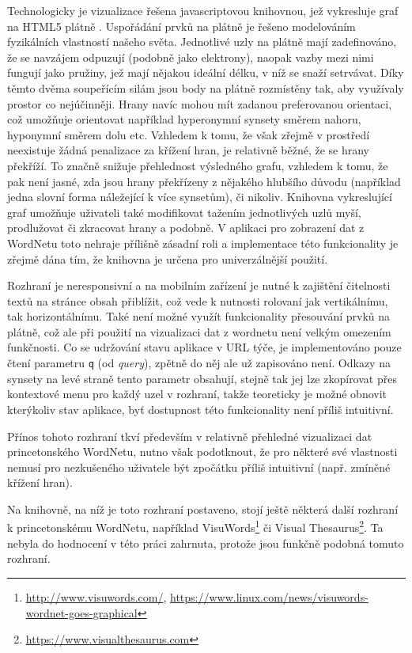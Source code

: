 \documentclass[a4paper, 11pt, oneside]{book}
\begin{document}
				Technologicky je vizualizace řešena javascriptovou knihovnou, jež vykresluje graf na HTML5 plátně \parencite{w3schools2017htmlcanvas}. Uspořádání prvků na plátně je řešeno modelováním fyzikálních vlastností našeho světa. Jednotlivé uzly na plátně mají zadefinováno, že se navzájem odpuzují (podobně jako elektrony), naopak vazby mezi nimi fungují jako pružiny, jež mají nějakou ideální délku, v níž se snaží setrvávat. Díky těmto dvěma soupeřícím silám jsou body na plátně rozmístěny tak, aby využívaly prostor co nejúčinněji. Hrany navíc mohou mít zadanou preferovanou orientaci, což umožňuje orientovat například hyperonymní synsety směrem nahoru, hyponymní směrem dolu etc. \parencite{wordvis2010vercruysse} Vzhledem k tomu, že však zřejmě v prostředí neexistuje žádná penalizace za křížení hran, je relativně běžné, že se hrany překříží. To značně snižuje přehlednost výsledného grafu, vzhledem k tomu, že pak není jasné, zda jsou hrany překřízeny z nějakého hlubšího důvodu (například jedna slovní forma náležející k více synsetům), či nikoliv. Knihovna vykreslující graf umožňuje uživateli také modifikovat tažením jednotlivých uzlů myší, prodlužovat či zkracovat hrany a podobně. V aplikaci pro zobrazení dat z WordNetu toto nehraje přílišně zásadní roli a implementace této funkcionality je zřejmě dána tím, že knihovna je určena pro univerzálnější použití. \parencite{wordvis2010vercruysse}

				Rozhraní je neresponsivní a na mobilním zařízení je nutné k zajištění čitelnosti textů na stránce obsah přiblížit, což vede k nutnosti rolovaní jak vertikálnímu, tak horizontálnímu. Také není možné využít funkcionality přesouvání prvků na plátně, což ale při použití na vizualizaci dat z wordnetu není velkým omezením funkčnosti. Co se udržování stavu aplikace v URL týče, je implementováno pouze čtení parametru {\tt q} (od \textit{query}), zpětně do něj ale už zapisováno není. Odkazy na synsety na levé straně tento parametr obsahují, stejně tak jej lze zkopírovat přes kontextové menu pro každý uzel v rozhraní, takže teoreticky je možné obnovit kterýkoliv stav aplikace, byť dostupnost této funkcionality není příliš intuitivní.

				Přínos tohoto rozhraní tkví především v relativně přehledné vizualizaci dat princetonského WordNetu, nutno však podotknout, že pro některé své vlastnosti nemusí pro nezkušeného uživatele být zpočátku příliš intuitivní (např. zmíněné křížení hran).

				Na knihovně, na níž je toto rozhraní postaveno, stojí ještě některá další rozhraní k princetonskému WordNetu, například VisuWords\footnote{\url{http://www.visuwords.com/}, \url{https://www.linux.com/news/visuwords-wordnet-goes-graphical}} či Visual Thesaurus\footnote{\url{https://www.visualthesaurus.com}}. Ta nebyla do hodnocení v této práci zahrnuta, protože jsou funkčně podobná tomuto rozhraní.
\end{document}
